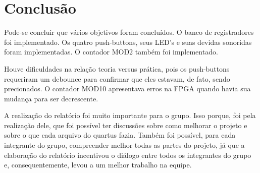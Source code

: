 \chapter{Conclusão}\label{cap_6_Conclusao}

Pode-se concluir que vários objetivos foram concluídos. O banco de registradores foi implementado. Os quatro push-buttons, seus LED's e suas devidas sonoridas foram implementadas. O contador MOD2 também foi implementado.


Houve dificuldades na relação teoria versus prática, pois os push-buttons requeriram um debounce para confirmar que eles estavam, de fato, sendo precionados. O contador MOD10 apresentava erros na FPGA quando havia sua mudança para ser decrescente.

A realização do relatório foi muito importante para o grupo. Isso porque, foi pela realização dele, que foi possível ter discussões sobre como melhorar o projeto e sobre o que cada arquivo do quartus fazia. Também foi possível, para cada integrante do grupo, compreender melhor todas as partes do projeto, já que a elaboração do relatório incentivou o diálogo entre todos os integrantes do grupo e, consequentemente, levou a um melhor trabalho na equipe.



